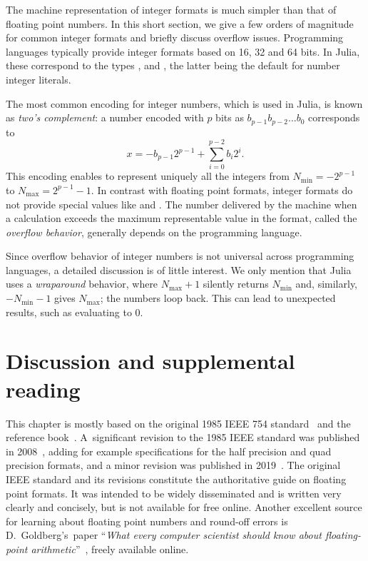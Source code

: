 The machine representation of integer formats is much simpler than that of floating point numbers.
In this short section,
we give a few orders of magnitude for common integer formats and briefly discuss overflow issues.
Programming languages typically provide integer formats based on 16, 32 and 64 bits.
In Julia, these correspond to the types ,  and ,
the latter being the default for number integer literals.

The most common encoding for integer numbers,
which is used in Julia, is known as \emph{two's complement}:
a number encoded with $p$ bits as $b_{p-1} b_{p-2} \dots b_{0}$ corresponds to
\[
    x = - b_{p-1} 2^{p-1} + \sum_{i=0}^{p-2} b_i 2^i.
\]
This encoding enables to represent uniquely all the integers from $N_{\min} = -2^{p-1}$ to $N_{\max} = 2^{p-1}-1$.
In contrast with floating point formats,
integer formats do not provide special values like  and .
The number delivered by the machine when a calculation exceeds the maximum representable value in the format,
called the \emph{overflow behavior}, generally depends on the programming language.

Since overflow behavior of integer numbers is not universal across programming languages,
a detailed discussion is of little interest.
We only mention that Julia uses a \emph{wraparound} behavior,
where $N_{\max} + 1$ silently returns $N_{\min}$ and,
similarly, $-N_{\min} - 1$ gives $N_{\max}$;
the numbers loop back.
This can lead to unexpected results,
such as  evaluating to 0.

\section{Discussion and supplemental reading}%
\label{sec:discussion_and_bibliograhpy}
This chapter is mostly based on the original 1985 IEEE 754 standard~\cite{ieee754} and the reference book~\cite{MR2265914}.
A~significant revision to the 1985 IEEE standard was published in 2008~\cite{ieee2008},
adding for example specifications for the half precision and quad precision formats,
and a minor revision was published in 2019~\cite{ieee2019}.
The original IEEE standard and its revisions constitute the authoritative guide on floating point formats.
It was intended to be widely disseminated and is written very clearly and concisely,
but is not available for free online.
Another excellent source for learning about floating point numbers and round-off errors is D.\ Goldberg's~paper ``\emph{What every computer scientist should know about floating-point arithmetic}''~\cite{goldberg1991every},
freely available online.
